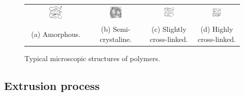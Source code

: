 \begin{figure}[!htb]
\centering
\begin{tabular}{@{}c@{}c@{}c@{}c@{}}
\includegraphics[width=0.25\textwidth]{chap1/include/figures/microstructure/microstructure-1.png}
& \includegraphics[width=0.25\textwidth]{chap1/include/figures/microstructure/microstructure-2.png}
& \includegraphics[width=0.25\textwidth]{chap1/include/figures/microstructure/microstructure-3.png}
& \includegraphics[width=0.25\textwidth]{chap1/include/figures/microstructure/microstructure-4.png}\\
\small (a) Amorphous. & \small (b) Semi-crystaline. & \small (c) Slightly cross-linked. & \small (d) Highly cross-linked.
\end{tabular}
\caption{Typical microscopic structures of polymers.}
\label{chap1:fig:polymer_processing_microstructure}
\end{figure}

\subsection{Extrusion process}
\label{chap1:subsec:polymer_processing_extrusion_process}

